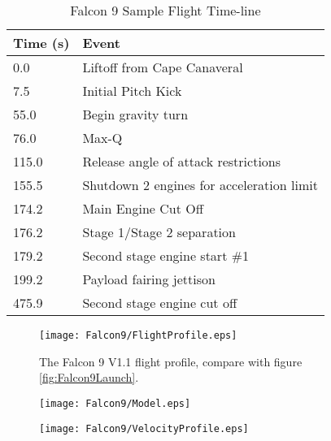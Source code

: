 \begin{table}[!htb]
\centering
\begin{tabular}{|l|l|}
\hline
\rowcolor[HTML]{C0C0C0} 
Time (s) & Event                                     \\ \hline
0.0      & Liftoff from Cape Canaveral               \\ \hline
\rowcolor[HTML]{EFEFEF} 
7.5      & Initial Pitch Kick                        \\ \hline
55.0     & Begin gravity turn                        \\ \hline
\rowcolor[HTML]{EFEFEF} 
76.0     & Max-Q                                     \\ \hline
115.0    & Release angle of attack restrictions      \\ \hline
\rowcolor[HTML]{EFEFEF} 
155.5    & Shutdown 2 engines for acceleration limit \\ \hline
174.2    & Main Engine Cut Off                       \\ \hline
\rowcolor[HTML]{EFEFEF} 
176.2    & Stage 1/Stage 2 separation                \\ \hline
179.2    & Second stage engine start \#1             \\ \hline
\rowcolor[HTML]{EFEFEF} 
199.2    & Payload fairing jettison                  \\ \hline
475.9    & Second stage engine cut off               \\ \hline
\end{tabular}
\caption{Falcon 9 Sample Flight Time-line \cite{Falcon9}}
\label{tab:Falcon9Timeline}
\end{table}

\begin{figure}[!htb] 
    \centering
    \texttt{[image: Falcon9/FlightProfile.eps]} 
    \caption{The Falcon 9 V1.1 flight profile, compare with figure \ref{fig:Falcon9Launch}.}
    \label{fig:Falcon9FlightProfile}
\end{figure}


\begin{figure}[!htb] 
    \centering
    \texttt{[image: Falcon9/Model.eps]}
    \caption{}
    \label{fig:Falcon9Model}
\end{figure}


\begin{figure}[!htb] 
    \centering
    \texttt{[image: Falcon9/VelocityProfile.eps]}
    \caption{}
    \label{fig:Falcon9VelocityProfile}
\end{figure}



